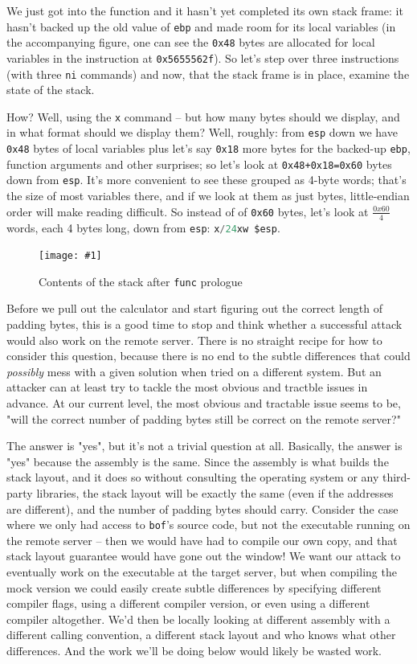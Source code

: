 \documentclass{article}
\newcommand{\displayimagecap}[2] {
\begin{figure}
    \centering
    \texttt{[image: \#1]} 
    \caption{#2}
\end{figure}
}
\newcommand{\xcode}[2]{\colorbox{ubuntuback}{\lstinline[language=#1]|#2|}}
\newcommand{\asm}[1]{\xcode{{[x86masm]assembler}}{#1}}
\newcommand{\code}[1]{\colorbox{ubuntuback}{\texttt{#1}}}
\newcommand{\gdb}[1]{\xcode{C}{#1}}
\begin{document}
We just got into the function and it hasn't yet completed its own stack frame: it hasn't backed up the old value of \asm{ebp} and made room for its local variables (in the accompanying figure, one can see the \code{0x48} bytes are allocated for local variables in the instruction at \code{0x5655562f}). So let's step over three instructions (with three \gdb{ni} commands) and now, that the stack frame is in place, examine the state of the stack. 

How? Well, using the \gdb{x} command -- but how many bytes should we display, and in what format should we display them? Well, roughly: from \asm{esp} down we have \code{0x48} bytes of local variables plus let's say \code{0x18} more bytes for the backed-up \asm{ebp}, function arguments and other surprises; so let's look at \code{0x48+0x18=0x60} bytes down from \asm{esp}. It's more convenient to see these grouped as 4-byte words; that's the size of most variables there, and if we look at them as just bytes, little-endian order will make reading difficult. So instead of of \code{0x60} bytes, let's look at $\frac{0x60}{4}$ words, each 4 bytes long, down from \asm{esp}: \gdb{x/24xw $esp}.

\displayimagecap{../02_bof/stack_view.png}{Contents of the stack after \code{func} prologue}

Before we pull out the calculator and start figuring out the correct length of padding bytes, this is a good time to stop and think whether a successful attack would also work on the remote server. There is no straight recipe for how to consider this question, because there is no end to the subtle differences that could \textit{possibly} mess with a given solution when tried on a different system. But an attacker can at least try to tackle the most obvious and tractble issues in advance. At our current level, the most obvious and tractable issue seems to be, "will the correct number of padding bytes still be correct on the remote server?"

The answer is "yes", but it's not a trivial question at all. Basically, the answer is "yes" because the assembly is the same. Since the assembly is what builds the stack layout, and it does so without consulting the operating system or any third-party libraries, the stack layout will be exactly the same (even if the addresses are different), and the number of padding bytes should carry. Consider the case where we only had access to \xcode{bash}{bof}'s source code, but not the executable running on the remote server -- then we would have had to compile our own copy, and that stack layout guarantee would have gone out the window! We want our attack to eventually work on the executable at the target server, but when compiling the mock version we could easily create subtle differences by specifying different compiler flags, using a different compiler version, or even using a different compiler altogether. We'd then be locally looking at different assembly with a different calling convention, a different stack layout and who knows what other differences. And the work we'll be doing below would likely be wasted work.
\end{document}
